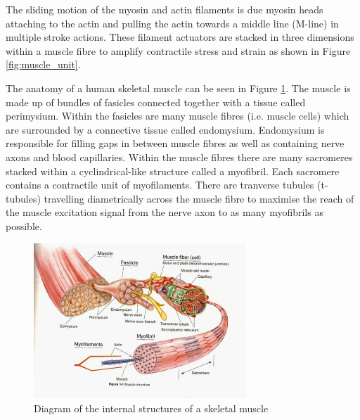 The sliding motion of the myosin and actin filaments is due myosin heads attaching to the actin and pulling the actin towards a middle line (M-line) in multiple stroke actions. These filament actuators are stacked in three dimensions within a muscle fibre to amplify contractile stress and strain as shown in Figure \ref{fig:muscle_unit}.

The anatomy of a human skeletal muscle can be seen in Figure \ref{fig:muscle_parts}. The muscle is made up of bundles of fasicles connected together with a tissue called perimysium. Within the fasicles are many muscle fibres (i.e. muscle cells) which are surrounded by a connective tissue called endomysium. Endomysium is responsible for filling gaps in between muscle fibres as well as containing nerve axons and blood capillaries. Within the muscle fibres there are many sacromeres stacked within a cyclindrical-like structure called a myofibril. Each sacromere contains a contractile unit of myofilaments. There are tranverse tubules (t-tubules) travelling diametrically across the muscle fibre to maximise the reach of the muscle excitation signal from the nerve axon to as many myofibrils as possible.

\begin{figure}[h!]
  \centering
  \includegraphics[width=8cm]{Figures/muscle structure.jpg}
  \caption{Diagram of the internal structures of a skeletal muscle\citep{Spina2014}}
  \label{fig:muscle_parts}
\end{figure}



